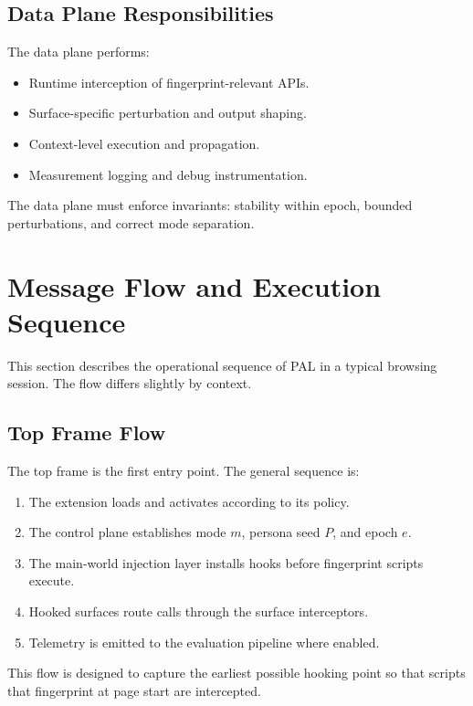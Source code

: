 \documentclass[11pt]{report}
\begin{document}
\subsection{Data Plane Responsibilities}

The data plane performs:
\begin{itemize}
    \item Runtime interception of fingerprint-relevant APIs.
    \item Surface-specific perturbation and output shaping.
    \item Context-level execution and propagation.
    \item Measurement logging and debug instrumentation.
\end{itemize}

The data plane must enforce invariants: stability within epoch, bounded perturbations, and correct mode separation.

\section{Message Flow and Execution Sequence}

This section describes the operational sequence of PAL in a typical browsing session. The flow differs slightly by context.

\subsection{Top Frame Flow}

The top frame is the first entry point. The general sequence is:

\begin{enumerate}
    \item The extension loads and activates according to its policy.
    \item The control plane establishes mode $m$, persona seed $P$, and epoch $e$.
    \item The main-world injection layer installs hooks before fingerprint scripts execute.
    \item Hooked surfaces route calls through the surface interceptors.
    \item Telemetry is emitted to the evaluation pipeline where enabled.
\end{enumerate}

This flow is designed to capture the earliest possible hooking point so that scripts that fingerprint at page start are intercepted.
\end{document}
